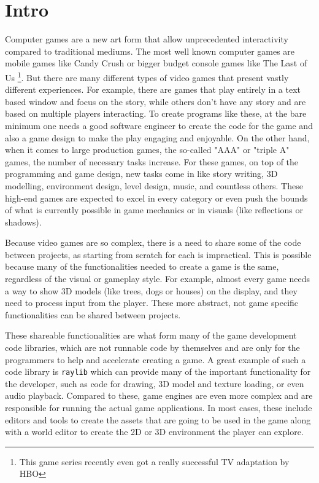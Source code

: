 \chapter{Intro}

Computer games are a new art form that allow unprecedented interactivity compared to traditional mediums.
The most well known computer games are mobile games like Candy Crush \cite{candy-crush} or bigger budget console games like The Last of Us \footnote{This game series recently even got a really successful TV adaptation by HBO}\cite{last-of-us}.
But there are many different types of video games that present vastly different experiences.
For example, there are games that play entirely in a text based window and focus on the story, while others don't have any story and are based on multiple players interacting.
To create programs like these, at the bare minimum one needs a good software engineer to create the code for the game and also a game design to make the play engaging and enjoyable.
On the other hand, when it comes to large production games, the so-called "AAA" or "triple A" games, the number of necessary tasks increase.
For these games, on top of the programming and game design, new tasks come in like story writing, 3D modelling, environment design, level design, music, and countless others.
These high-end games are expected to excel in every category or even push the bounds of what is currently possible in game mechanics or in visuals (like reflections or shadows).

Because video games are so complex, there is a need to share some of the code between projects, as starting from scratch for each is impractical.
This is possible because many of the functionalities needed to create a game is the same, regardless of the visual or gameplay style.
For example, almost every game needs a way to show 3D models (like trees, dogs or houses) on the display, and they need to process input from the player.
These more abstract, not game specific functionalities can be shared between projects.

These shareable functionalities are what form many of the game development code libraries, which are not runnable code by themselves and are only for the programmers to help and accelerate creating a game.
A great example of such a code library is \verb|raylib| \cite{raylib} which can provide many of the important functionality for the developer, such as code for drawing, 3D model and texture loading, or even audio playback.
Compared to these, game engines are even more complex and are responsible for running the actual game applications.
In most cases, these include editors and tools to create the assets that are going to be used in the game along with a world editor to create the 2D or 3D environment the player can explore.

